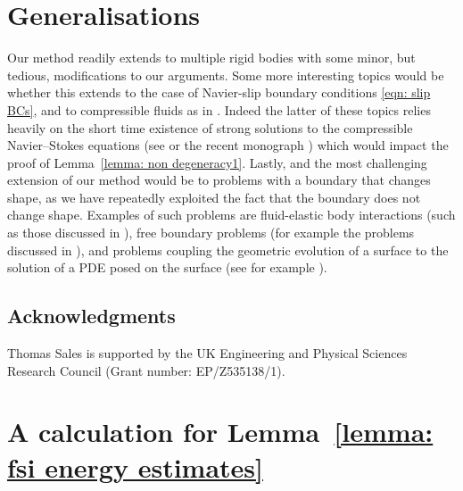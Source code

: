 \documentclass[a4paper]{amsart}
\numberwithin{equation}{section}
\theoremstyle{plain}
\begin{document}
\section*{Generalisations}
Our method readily extends to multiple rigid bodies with some minor, but tedious, modifications to our arguments.
Some more interesting topics would be whether this extends to the case of Navier-slip boundary conditions \eqref{eqn: slip BCs}, and to compressible fluids as in \cite{feireisl2003motion}.
Indeed the latter of these topics relies heavily on the short time existence of strong solutions to the compressible Navier--Stokes equations (see \cite{feireisl2004dynamics} or the recent monograph \cite{kreml2025book}) which would impact the proof of Lemma~\ref{lemma: non degeneracy1}.
Lastly, and the most challenging extension of our method would be to problems with a boundary that changes shape, as we have repeatedly exploited the fact that the boundary does not change shape.
Examples of such problems are fluid-elastic body interactions (such as those discussed in \cite{benevsova2023variational,vcanic2021moving}), free boundary problems (for example the problems discussed in \cite{EllOckBook82}), and problems coupling the geometric evolution of a surface to the solution of a PDE posed on the surface (see for example \cite{abels2023short}).

\subsection*{Acknowledgments}
Thomas Sales is supported by the UK Engineering and Physical Sciences Research Council (Grant number: EP/Z535138/1).

\appendix
\section{A calculation for Lemma~\ref{lemma: fsi energy estimates}}
\label{appendix: bihari use}
\end{document}
